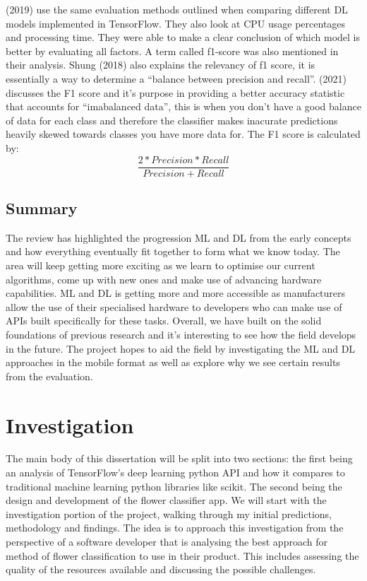 \documentclass{article}
\begin{document}
\par

\citeauthor{Chockwanich} (2019) use the same evaluation methods outlined when comparing different DL models 
implemented in TensorFlow. They also look at CPU usage percentages and processing time. They were able to make a clear 
conclusion of which model is better by evaluating all factors. A term called f1-score was also mentioned in their 
analysis. Shung (2018) also explains the relevancy of f1 score, it is essentially a way to determine a “balance between
precision and recall”. \citeauthor{kors2021} (2021) discusses the F1 score and it's purpose in providing a better 
accuracy statistic that accounts for “imabalanced data”, this is when you don't have a good balance of data for each 
class and therefore the classifier makes inacurate predictions heavily skewed towards classes you have more data for. 
The F1 score is calculated by:
\[\frac{2*Precision*Recall}{Precision + Recall}\]

\subsection{Summary}

The review has highlighted the progression ML and DL from the early concepts and how everything eventually fit 
together to form what we know today. The area will keep getting more exciting as we learn to optimise our current 
algorithms, come up with new ones and make use of advancing hardware capabilities. ML and DL is getting more and more 
accessible as manufacturers allow the use of their specialised hardware to developers who can make use of APIs built 
specifically for these tasks. Overall, we have built on the solid foundations of previous research and it's interesting 
to see how the field develops in the future. The project hopes to aid the field by investigating the ML and DL 
approaches in the mobile format as well as explore why we see certain results from the evaluation.

\clearpage

\section{Investigation}

The main body of this dissertation will be split into two sections: the first being an analysis of TensorFlow's deep 
learning python API and how it compares to traditional machine learning python libraries like scikit. The second being 
the design and development of the flower classifier app. We will start with the investigation portion of the project,
walking through my initial predictions, methodology and findings. The idea is to approach this investigation from the 
perspective of a software developer that is analysing the best approach for method of flower classification to use in 
their product. This includes assessing the quality of the resources available and discussing the possible challenges.
\end{document}
